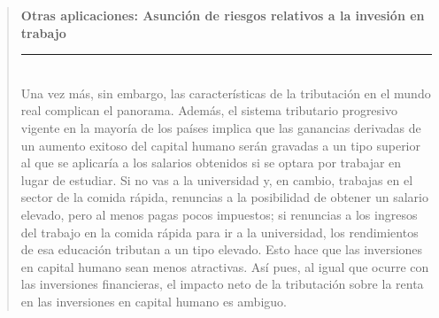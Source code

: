 \documentclass[10pt,a4paper]{article}
\newenvironment{specialblock}[1]{%
      \begin{quote} %
      \small %
      \noindent\textbf{#1}\\[-0.3em] %
      \rule{\linewidth}{0.4pt}\\[0.6em]}{
      \end{quote}}
\begin{document}
\begin{specialblock}{\textbf{Otras aplicaciones}: Asunción de riesgos relativos a la invesión en trabajo}
    Una vez más, sin embargo, las características de la tributación en el mundo real complican el panorama. Además, el sistema tributario progresivo vigente en la mayoría de los países implica que las ganancias derivadas de un aumento exitoso del capital humano serán gravadas a un tipo superior al que se aplicaría a los salarios obtenidos si se optara por trabajar en lugar de estudiar. Si no vas a la universidad y, en cambio, trabajas en el sector de la comida rápida, renuncias a la posibilidad de obtener un salario elevado, pero al menos pagas pocos impuestos; si renuncias a los ingresos del trabajo en la comida rápida para ir a la universidad, los rendimientos de esa educación tributan a un tipo elevado. Esto hace que las inversiones en capital humano sean menos atractivas. Así pues, al igual que ocurre con las inversiones financieras, el impacto neto de la tributación sobre la renta en las inversiones en capital humano es ambiguo.
\end{specialblock}
\end{document}
